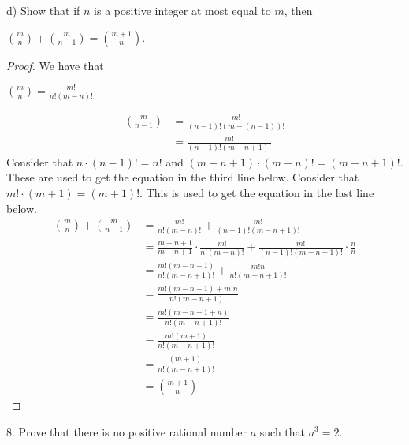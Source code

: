 \documentclass[12pt]{article}
\begin{document}
d) Show that if $n$ is a positive integer at most equal to $m$, then
\begin{center}
$\displaystyle \binom{m}{n}+\displaystyle \binom{m}{n-1}=\displaystyle \binom{m+1}{n}$.
\end{center}
\begin{proof}
We have that
\begin{center}
$\displaystyle \binom{m}{n}=\displaystyle \frac{m!}{n!(m-n)!}$
\end{center}
\begin{align*}
\displaystyle \binom{m}{n-1}&=\displaystyle \frac{m!}{(n-1)!(m-(n-1))!} \\
&=\displaystyle \frac{m!}{(n-1)!(m-n+1)!}
\end{align*}
Consider that $n\cdot(n-1)!=n!$ and $(m-n+1)\cdot(m-n)!=(m-n+1)!$. These are used to get the equation in the third line below. Consider that $m!\cdot(m+1)=(m+1)!$. This is used to get the equation in the last line below.
\begin{align*}
\displaystyle \binom{m}{n}+\displaystyle \binom{m}{n-1}&=\displaystyle \frac{m!}{n!(m-n)!}+\displaystyle \frac{m!}{(n-1)!(m-n+1)!} \\
&=\displaystyle \frac{m-n+1}{m-n+1}\cdot\displaystyle \frac{m!}{n!(m-n)!}+\displaystyle \frac{m!}{(n-1)!(m-n+1)!}\cdot\displaystyle \frac{n}{n} \\
&=\displaystyle \frac{m!(m-n+1)}{n!(m-n+1)!}+\displaystyle \frac{m!n}{n!(m-n+1)!} \\
&=\displaystyle \frac{m!(m-n+1)+m!n}{n!(m-n+1)!} \\
&=\displaystyle \frac{m!(m-n+1+n)}{n!(m-n+1)!} \\
&=\displaystyle \frac{m!(m+1)}{n!(m-n+1)!} \\
&=\displaystyle \frac{(m+1)!}{n!(m-n+1)!} \\
&=\displaystyle \binom{m+1}{n}
\end{align*}
\end{proof}
8. Prove that there is no positive rational number $a$ such that $a^3=2$.
\end{document}
